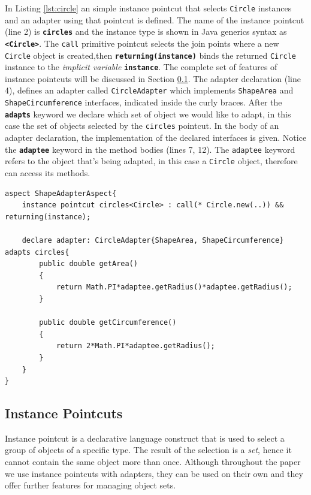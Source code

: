 \documentclass{llncs}
\begin{document}
In Listing \ref{lst:circle} an simple instance pointcut that selects \texttt{Circle} instances and an adapter using that pointcut is defined. The name of the instance pointcut (line 2) is \textbf{\texttt{circles}} and the instance type is shown in Java generics syntax as \texttt{\textbf{<Circle>}}. The \texttt{call} primitive pointcut selects the join points where a new \texttt{Circle} object is created,then \texttt{\textbf{returning(instance)}} binds the returned \texttt{Circle} instance to the \emph{implicit variable} \texttt{\textbf{instance}}. The complete set of features of instance pointcuts will be discussed in Section \ref{sec:ip}. The adapter declaration (line 4), defines an adapter called \texttt{CircleAdapter} which implements \texttt{ShapeArea} and \texttt{ShapeCircumference} interfaces, indicated inside the curly braces. After the \texttt{\textbf{adapts}} keyword we declare which set of object we would like to adapt, in this case the set of objects selected by the \texttt{circles} pointcut. In the body of an adapter declaration, the implementation of the declared interfaces is given. Notice the \texttt{\textbf{adaptee}} keyword in the method bodies (lines 7, 12). The \texttt{adaptee} keyword refers to the object that's being adapted, in this case a \texttt{Circle} object, therefore can access its methods. 

\begin{lstlisting}[float=tb, caption={An instance pointcut selecting Circle objects and an adapter declaration using this pointcut}, label={lst:circle}]
aspect ShapeAdapterAspect{
	instance pointcut circles<Circle> : call(* Circle.new(..)) && returning(instance);

	declare adapter: CircleAdapter{ShapeArea, ShapeCircumference} adapts circles{
		public double getArea()
		{
			return Math.PI*adaptee.getRadius()*adaptee.getRadius();
		}
				
		public double getCircumference()
		{
			return 2*Math.PI*adaptee.getRadius();
		}
	}
}
\end{lstlisting}

\subsection{Instance Pointcuts}
\label{sec:ip}
Instance pointcut is a declarative language construct that is used to select a group of objects of a specific type. The result of the selection is a \emph{set}, hence it cannot contain the same object more than once. Although throughout the paper we use instance pointcuts with adapters, they can be used on their own and they offer further features for managing object sets.
\end{document}
